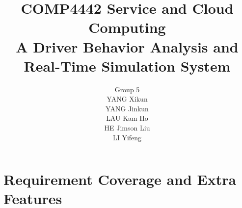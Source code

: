 \documentclass[12pt,a4paper]{article}
\begin{document}
\title{\normalsize COMP4442 Service and Cloud Computing\\
\large \textbf{A Driver Behavior Analysis and Real-Time Simulation System}}

\author{
\small Group 5\\
\normalsize YANG Xikun\\
\normalsize YANG Jinkun\\
\normalsize LAU Kam Ho\\
\normalsize HE Jimson Liu\\
\normalsize LI Yifeng
}

\date{}
\maketitle

\tableofcontents
\newpage

\section{Requirement Coverage and Extra Features}
\end{document}
